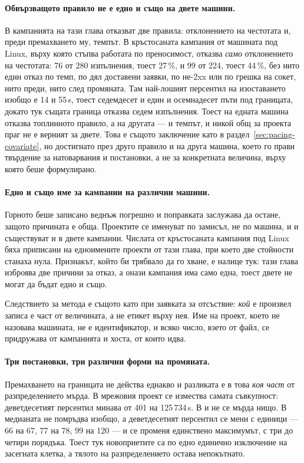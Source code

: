 \paragraph{Обвързващото правило не е едно и също на двете машини.} В кампанията на тази глава
отказват две правила: отклонението на честотата и, преди премахването му, темпът. В кръстосаната
кампания от машината под Linux, върху която стъпва работата по преносимост, отказва \emph{само}
отклонението на честотата: 76 от 280 изпълнения, тоест 27\,\%, и 99 от 224, тоест 44\,\%, без нито
един отказ по темп, по дял доставени заявки, по не-2xx или по грешка на сокет, нито преди, нито след
промяната. Там най-лошият персентил на изоставането изобщо е 14 и 55\,\textmu s, тоест седемдесет и
един и осемнадесет пъти под границата, докато тук същата граница отказва седем изпълнения. Тоест на
едната машина отказва топлинното правило, а на другата — и темпът, и никой общ за проекта праг не е
верният за двете. Това е същото заключение като в раздел~\ref{sec:pacing-covariate}, но достигнато
през друго правило и на друга машина, което го прави твърдение за натоварвания и постановки, а не за
конкретната величина, върху която беше формулирано.

\paragraph{Едно и също име за кампании на различни машини.} Горното беше записано веднъж погрешно и
поправката заслужава да остане, защото причината е обща. Проектите се именуват по замисъл, не по
машина, и  и  съществуват и в двете кампании. Числата от кръстосаната
кампания под Linux бяха приписани на едноимените проекти от тази глава, при което две стойности
станаха нула. Признакът, който би трябвало да го хване, е налице тук: тази глава изброява две
причини за отказ, а онази кампания има само една, тоест двете не могат да бъдат едно и също.

Следствието за метода е същото като при заявката за отсъствие: \emph{кой} е произвел записа е част от
величината, а не етикет върху нея. Име на проект, което не назовава машината, не е идентификатор, и
всяко число, взето от файл, се придружава от кампанията и хоста, от които идва.

\paragraph{Три постановки, три различни форми на промяната.} Премахването на границата не действа
еднакво и разликата е в това \emph{коя част} от разпределението мърда.
В мрежовия проект се измества самата съвкупност: деветдесетият персентил минава от 401 на
125\,734\,\textmu s. В  и  не се мърда нищо. В  медианата
не помръдва изобщо, а деветдесетият персентил се мени с единици — 66 на 67, 77 на 78, 99 на 120 —
и се променя единствено максимумът, с три до четири порядъка. Тоест тук новоприетите са по едно
единично изключение на засегната клетка, а тялото на разпределението остава непокътнато.

